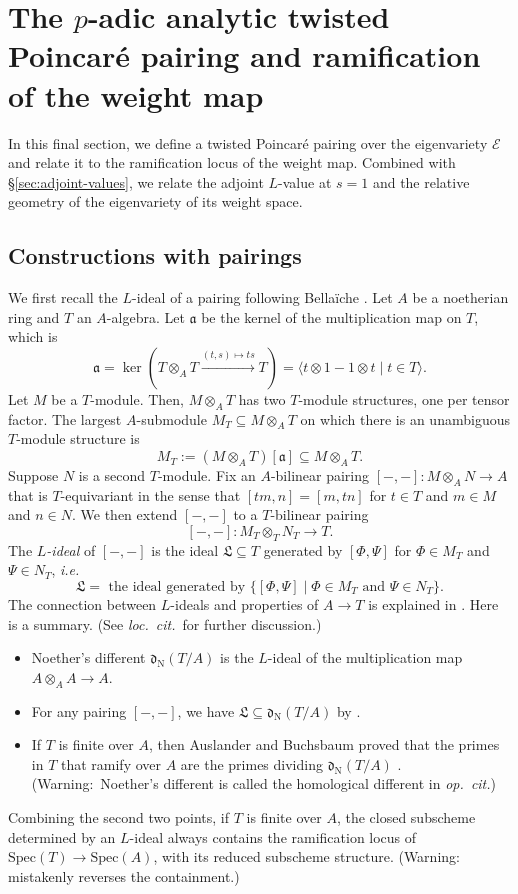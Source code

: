 \documentclass[10pt, twoside]{amsart}
\theoremstyle{plain}
\theoremstyle{definition}
\theoremstyle{remark}
\numberwithin{equation}{subsection}
\def\gd{\mathfrak d}
\def\gdN{\gd_{\mathrm{N}}}
\def\gL{\mathfrak L}
\def\ga{\mathfrak a}
\def\scre{\mathscr E}
\def\Spec{\mathrm{Spec}}
\begin{document}
\section{The $p$-adic analytic twisted Poincar\'e pairing and ramification of the weight map}\label{section:poincare-ramification}

In this final section, we define a twisted Poincar\'e pairing over the eigenvariety $\scre$ and relate it to the ramification locus of the weight map. Combined with \S \ref{sec:adjoint-values}, we relate the adjoint $L$-value at $s = 1$ and the relative geometry of the eigenvariety of its weight space.

\subsection{Constructions with pairings}\label{subsec:L-ideal-formal-constructions}

We first recall the $L$-ideal of a pairing following Bella\"iche \cite[\S 9.1.3]{Bel}. Let $A$ be a noetherian ring and $T$ an $A$-algebra. Let $\ga$ be the kernel of the multiplication map on $T$, which is
$$
\ga = \ker\left(T \otimes_A T \xrightarrow{(t,s) \mapsto ts} T\right) = \langle t \otimes 1 - 1 \otimes t \mid t \in T\rangle.
$$
Let $M$ be a $T$-module.  Then, $M\otimes_A T$ has two $T$-module structures, one per tensor factor. The largest $A$-submodule $M_T \subseteq M\otimes_A T$ on which there is an unambiguous $T$-module structure is
$$
M_T := (M\otimes_A T)[\ga] \subseteq M\otimes_A T.
$$
Suppose $N$ is a second $T$-module. Fix an $A$-bilinear pairing $[-,-] : M\otimes_A N \rightarrow A$ that is $T$-equivariant in the sense that $[tm,n] = [m,tn]$ for $t \in T$ and $m\in M$ and $n \in N$. We then extend $[-,-]$ to a $T$-bilinear pairing
$$
[-,-] : M_T \otimes_T N_T \rightarrow T.
$$
{The {\em $L$-ideal} of $[-,-]$ is the ideal $\gL \subseteq T$  generated by 
$[\Phi,\Psi]$ for $\Phi \in M_T$ and  $\Psi \in N_T$, \emph{i.e.}  
$$
\gL =\text{ the ideal generated by } \{[\Phi,\Psi] \mid \Phi \in M_T \text{ and } \Psi \in N_T\}.
$$}
The connection between $L$-ideals and properties of $A \rightarrow T$ is explained in \cite[\S 9.1]{Bel}. Here is a summary. (See {\em loc.\ cit.}\ for further discussion.)
\begin{itemize}
\item Noether's different $\gdN(T/A)$ is the $L$-ideal of the multiplication map $A \otimes_A A \rightarrow A$. 
\item For any pairing $[-,-]$, we have $\gL \subseteq \gdN(T/A)$ by \cite[Proposition 9.1.10]{Bel}.
\item If $T$ is finite over $A$, then Auslander and Buchsbaum proved that the primes in $T$ that ramify over $A$ are the primes dividing $\gdN(T/A)$ \cite[Theorem 2.7]{AB}. (Warning:\ Noether's different is called the homological different in {\em op.\ cit.})
\end{itemize}
Combining the second two points, if $T$ is finite over $A$, the closed subscheme determined by an $L$-ideal always contains the ramification locus of $\Spec(T) \rightarrow \Spec(A)$, with its reduced subscheme structure. (Warning:\ \cite[Theorem 9.4.7]{Bel} mistakenly reverses the containment.) 
\end{document}
